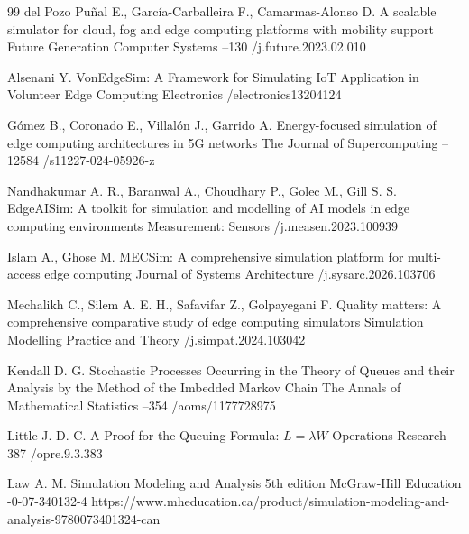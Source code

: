 \begin{thebibliography}{99}
\by del Pozo Pu\~nal E., Garc\'ia-Carballeira F., Camarmas-Alonso D.
\paper A scalable simulator for cloud, fog and edge computing platforms with mobility support
\jour Future Generation Computer Systems
--130
/j.future.2023.02.010

\by Alsenani Y.
\paper VonEdgeSim: A Framework for Simulating IoT Application in Volunteer Edge Computing
\jour Electronics
/electronics13204124

\by G\'omez B., Coronado E., Villal\'on J., Garrido A.
\paper Energy-focused simulation of edge computing architectures in 5G networks
\jour The Journal of Supercomputing
--12584
/s11227-024-05926-z

\by Nandhakumar A. R., Baranwal A., Choudhary P., Golec M., Gill S. S.
\paper EdgeAISim: A toolkit for simulation and modelling of AI models in edge computing environments
\jour Measurement: Sensors
/j.measen.2023.100939

\by Islam A., Ghose M.
\paper MECSim: A comprehensive simulation platform for multi-access edge computing
\jour Journal of Systems Architecture
/j.sysarc.2026.103706

\by Mechalikh C., Silem A. E. H., Safavifar Z., Golpayegani F.
\paper Quality matters: A comprehensive comparative study of edge computing simulators
\jour Simulation Modelling Practice and Theory
/j.simpat.2024.103042

\by Kendall D. G.
\paper Stochastic Processes Occurring in the Theory of Queues and their Analysis by the Method of the Imbedded Markov Chain
\jour The Annals of Mathematical Statistics
--354
/aoms/1177728975

\by Little J. D. C.
\paper A Proof for the Queuing Formula: $L=\lambda W$
\jour Operations Research
--387
/opre.9.3.383

\by Law A. M.
\book Simulation Modeling and Analysis
\edition 5th edition
\publ McGraw-Hill Education
-0-07-340132-4
\URL https://www.mheducation.ca/product/simulation-modeling-and-analysis-9780073401324-can


\end{thebibliography}
